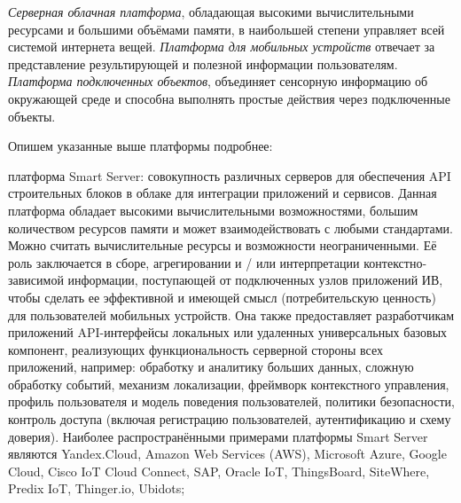 \textit{Серверная облачная платформа}, обладающая высокими вычислительными ресурсами и большими объёмами памяти, в наибольшей степени управляет всей системой интернета вещей. \textit{Платформа для мобильных устройств} отвечает за представление результирующей и полезной информации пользователям. \textit{Платформа подключенных объектов}, объединяет сенсорную информацию об окружающей среде и способна выполнять простые действия через подключенные объекты.

Опишем указанные выше платформы подробнее:
\begin{textitemize}
	\item платформа Smart Server: совокупность различных серверов для обеспечения API строительных блоков в облаке для интеграции приложений и сервисов. Данная платформа обладает высокими вычислительными возможностями, большим количеством ресурсов памяти и может взаимодействовать с любыми стандартами. Можно считать вычислительные ресурсы и возможности неограниченными. Её роль заключается в сборе, агрегировании и / или интерпретации контекстно-зависимой информации, поступающей от подключенных узлов приложений ИВ, чтобы сделать ее эффективной и имеющей смысл (потребительскую ценность) для пользователей мобильных устройств. Она также предоставляет разработчикам приложений API-интерфейсы локальных или удаленных универсальных базовых компонент, реализующих функциональность серверной стороны всех приложений, например: обработку и аналитику больших данных, сложную обработку событий, механизм локализации, фреймворк контекстного управления, профиль пользователя и модель поведения пользователей, политики безопасности, контроль доступа (включая регистрацию пользователей, аутентификацию и схему доверия). Наиболее распространёнными примерами платформы Smart Server являются Yandex.Cloud, Amazon Web Services (AWS), Microsoft Azure, Google Cloud, Cisco IoT Cloud Connect, SAP, Oracle IoT, ThingsBoard, SiteWhere, Predix IoT, Thinger.io, Ubidots;

\end{textitemize}
